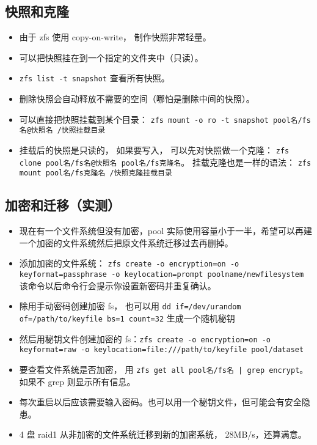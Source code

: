 \subsection{快照和克隆}
\begin{itemize}
\item 由于 zfs 使用 copy-on-write， 制作快照非常轻量。
\item 可以把快照挂在到一个指定的文件夹中（只读）。
\item \verb|zfs list -t snapshot| 查看所有快照。
\item 删除快照会自动释放不需要的空间（哪怕是删除中间的快照）。
\item 可以直接把快照挂载到某个目录： \verb|zfs mount -o ro -t snapshot pool名/fs名@快照名 /快照挂载目录|
\item 挂载后的快照是只读的， 如果要写入， 可以先对快照做一个克隆： \verb|zfs clone pool名/fs名@快照名 pool名/fs克隆名|。 挂载克隆也是一样的语法： \verb|zfs mount pool名/fs克隆名 /快照克隆挂载目录|
\end{itemize}

\subsection{加密和迁移（实测）}
\begin{itemize}
\item 现在有一个文件系统但没有加密，pool 实际使用容量小于一半，希望可以再建一个加密的文件系统然后把原文件系统迁移过去再删掉。
\item 添加加密的文件系统： \verb`zfs create -o encryption=on -o keyformat=passphrase -o keylocation=prompt poolname/newfilesystem` 该命令以后命令行会提示你设置新密码并重复确认。
\item 除用手动密码创建加密 fs， 也可以用 \verb`dd if=/dev/urandom of=/path/to/keyfile bs=1 count=32` 生成一个随机秘钥
\item 然后用秘钥文件创建加密的 fs：\verb`zfs create -o encryption=on -o keyformat=raw -o keylocation=file:///path/to/keyfile pool/dataset`
\item 要查看文件系统是否加密， 用 \verb`zfs get all pool名/fs名 | grep encrypt`。 如果不 grep 则显示所有信息。
\item 每次重启以后应该需要输入密码。也可以用一个秘钥文件，但可能会有安全隐患。
\item 4 盘 raid1 从非加密的文件系统迁移到新的加密系统， 28MB/s，还算满意。
\end{itemize}

